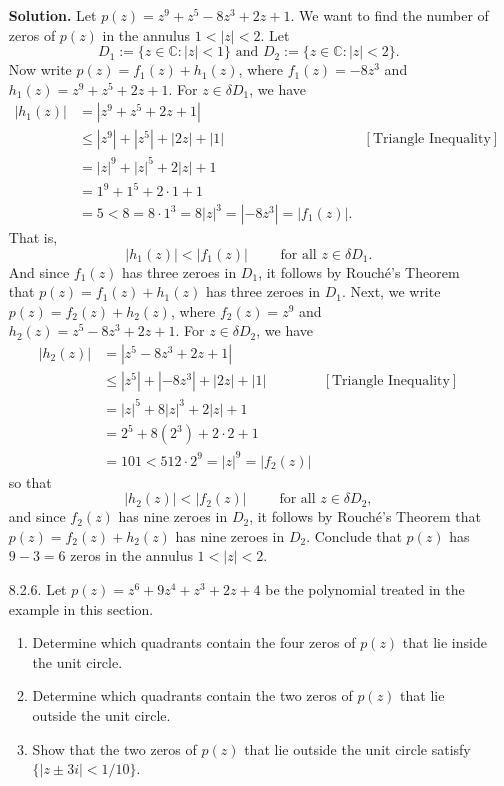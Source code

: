 \documentclass[9pt]{article}
\newcommand{\C}{\mathbb{C}}
\begin{document}
\begin{enumerate}
      \textbf{Solution.} Let $p(z) = z^9 + z^5 - 8z^3 + 2z + 1$. We want to find
      the number of zeros of $p(z)$ in the annulus $1 < |z| < 2$. Let
      $$D_1 := \{z \in \C : |z| < 1\} \text{ and }
        D_2 := \{z \in \C : |z| < 2\}.$$
      Now write $p(z) = f_1(z) + h_1(z)$, where $f_1(z) = -8z^3$ and
      $h_1(z) = z^9 + z^5 + 2z + 1$. For $z \in \delta D_1$, we have
      \begin{align*}
         |h_1(z)| &= |z^9 + z^5 + 2z + 1| \\
            &\le |z^9| + |z^5| + |2z| + |1| &[\text{Triangle Inequality}] \\
            &= |z|^9 + |z|^5 + 2|z| + 1 \\
            &= 1^9 + 1^5 + 2 \cdot 1 + 1 \\
            &= 5 < 8 = 8 \cdot 1^3 = 8|z|^3 = |-8z^3| = |f_1(z)|.      
      \end{align*}
      That is,
      $$|h_1(z)| < |f_1(z)| \qquad \text{ for all } z \in \delta D_1.$$
      And since $f_1(z)$ has three zeroes in $D_1$, it follows by Rouch\'{e}'s
      Theorem that $p(z) = f_1(z) + h_1(z)$ has three zeroes in $D_1$. Next, we
      write $p(z) = f_2(z) + h_2(z)$, where $f_2(z) = z^9$ and
      $h_2(z) = z^5 - 8z^3 + 2z + 1$. For $z \in \delta D_2$, we have
      \begin{align*}
         |h_2(z)| &= |z^5 - 8z^3 + 2z + 1| \\
            &\le |z^5| + |-8z^3| + |2z| + |1| &[\text{Triangle Inequality}] \\
            &= |z|^5 + 8|z|^3 + 2|z| + 1 \\
            &= 2^5 + 8(2^3) + 2 \cdot 2 + 1 \\
            &= 101 < 512 \cdot 2^9 = |z|^9 = |f_2(z)|
      \end{align*}
      so that
      $$|h_2(z)| < |f_2(z)| \qquad \text{ for all } z \in \delta D_2,$$
      and since $f_2(z)$ has nine zeroes in $D_2$, it follows by Rouch\'{e}'s
      Theorem that $p(z) = f_2(z) + h_2(z)$ has nine zeroes in $D_2$. Conclude
      that $p(z)$ has $9 - 3 = 6$ zeros in the annulus $1 < |z| < 2$.
   \item[8.2.6.]  Let $p(z) = z^6 + 9z^4 + z^3 + 2z + 4$ be the polynomial
                  treated in the example in this section.
                  \begin{enumerate}
                     \item Determine which quadrants contain the four zeros of
                           $p(z)$ that lie inside the unit circle.
                     \item Determine which quadrants contain the two zeros of
                           $p(z)$ that lie outside the unit circle.
                     \item Show that the two zeros of $p(z)$ that lie outside
                           the unit circle satisfy $\{|z \pm 3i| < 1/10\}$.
                  \end{enumerate}


\end{enumerate}
\end{document}
